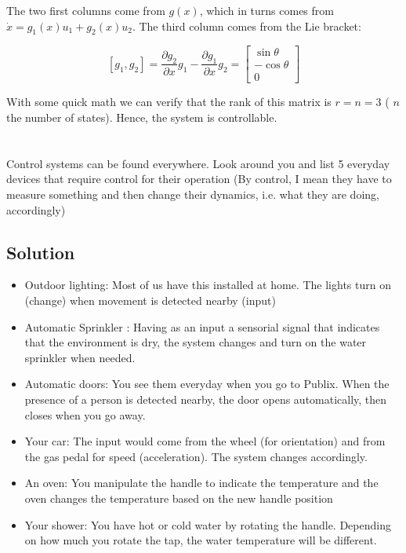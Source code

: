 \documentclass[10pt,a4paper]{article}
\begin{document}
The two first columns come from $g(x)$, which in turns comes from $\dot{x} = g_{1}(x)u_{1} + g_{2}(x)u_{2}$. The third column comes from the Lie bracket:

\[ [g_{1}, g_{2}] = \dfrac{\partial g_{2}}{\partial x} g_{1} - \dfrac{\partial g_{1}}{\partial x} g_{2} = 
\begin{bmatrix}
\sin \theta \\
- \cos \theta \\
0
\end{bmatrix}
\] 

With some quick math we can verify that the rank of this matrix is $r = n = 3$ ( $n$ the number of states). Hence, the system is controllable.

\section{}
Control systems can be found everywhere. Look around you and list 5 everyday devices that require control for their operation (By control, I mean they have to measure something and then change their dynamics, i.e. what they are doing, accordingly)
\subsection*{Solution}
\begin{itemize}
\item{ Outdoor lighting: Most of us have this installed at home. The lights turn on (change) when movement is detected nearby (input)}
\item{ Automatic Sprinkler : Having as an input a sensorial signal that indicates that the environment is dry, the system changes and turn on the water sprinkler when needed.}
\item{ Automatic doors: You see them everyday when you go to Publix. When the presence of a person is detected nearby, the door opens automatically, then closes when you go away. }
\item{ Your car: The input would come from the wheel (for orientation) and from the gas pedal for speed (acceleration). The system changes accordingly.}
\item{ An oven: You manipulate the handle to indicate the temperature and the oven changes the temperature based on the new handle position}
\item{ Your shower: You have hot or cold water by rotating the handle. Depending on how much you rotate the tap, the water temperature will be different.}
\end{itemize}
\end{document}
